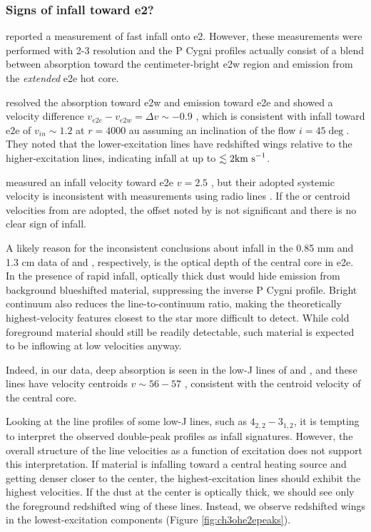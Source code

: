 \documentclass{emulateapj}
\begin{document}
\subsubsection{Signs of infall toward e2?}
\citet{Zhang1997a}  reported a measurement of fast infall onto e2.
However, these measurements were performed with 2-3 \arcsec resolution and the
P Cygni profiles actually consist of a blend between absorption toward the
centimeter-bright e2w \hii region and emission from the \emph{extended} e2e hot
core.  

\citet{Goddi2016a} resolved the absorption toward e2w and emission
toward e2e and showed a velocity difference $v_{e2e}-v_{e2w} = \Delta v \sim
-0.9$ \kms, which is consistent with infall toward e2e of $v_{in}\sim1.2$ \kms
at $r=4000$ au assuming an inclination of the flow $i=45\deg$.  They noted
that the lower-excitation \ammonia lines have redshifted wings relative to
the higher-excitation lines, indicating infall at up to $\lesssim2\textrm{km~s}^{-1}$.

\citet{Shi2010a} measured an infall velocity toward e2e $v=2.5$ \kms, 
but their adopted systemic velocity is inconsistent with measurements
using radio lines \citep{Goddi2016a}.  If the \methanol or \ammonia centroid
velocities from \citet{Goddi2016a} are adopted, the offset noted by
\citet{Shi2010a} is not significant and there is no clear sign of infall.

A likely reason for the inconsistent conclusions about infall in the 0.85 mm
and 1.3 cm data of \citet{Shi2010a} and \citet{Goddi2016a}, respectively, is
the optical depth of the central core in e2e.  In the presence of rapid infall,
optically thick dust would hide emission from background blueshifted material,
suppressing the inverse P Cygni profile.  Bright continuum also reduces the
line-to-continuum ratio, making the theoretically highest-velocity features
closest to the star more difficult to detect.  While cold foreground material
should still be readily detectable, such material is expected to be inflowing
at low velocities anyway.

Indeed, in our data, deep absorption is seen in the low-J lines of
\formaldehyde and \methanol, and these lines have velocity centroids
$v\sim56-57$ \kms, consistent with the centroid velocity of the central core.

Looking at the line profiles of some low-J lines, such as \methanol
$4_{2,2}-3_{1,2}$, it is tempting to interpret the observed double-peak
profiles as infall signatures.  However, the overall structure of the line
velocities as a function of excitation does not support this interpretation.
If material is infalling toward a central heating source and getting denser
closer to the center, the highest-excitation lines should exhibit the highest
velocities.  If the dust at the center is optically thick, we should see only
the foreground redshifted wing of these lines.  Instead, we observe redshifted
wings in the lowest-excitation components (Figure \ref{fig:ch3ohe2epeaks}).
\end{document}
